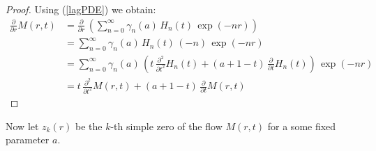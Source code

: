 \documentclass[a4paper,11pt,twoside]{amsart}
\newcommand{\verifiedeq}{=}
\newcommand{\verifiedeq}{\stackrel{\checkmark}{=}}
\begin{document}
\begin{proof}
Using (\ref{lagPDE}) we obtain:
\begin{align}
 \frac{\partial}{\partial r}M(r,t) &\verifiedeq  \frac{\partial}{\partial r}\,\left(\sum_{n=0}^\infty \gamma_n(a)\,H_n(t)\,\exp(-nr)\right) \\
 &\verifiedeq \sum_{n=0}^\infty \gamma_n(a)\,H_n(t)\,\left(-n\right)\,\exp(-nr) \\
 &\verifiedeq \sum_{n=0}^\infty \gamma_n(a)\,\left(t\,\frac{\partial^2}{\partial t^2}H_n(t)+ (a+1-t)\, \frac{\partial}{\partial t}H_n(t)  \right)\, \exp(-nr)\\
 &\verifiedeq t\,\frac{\partial^2}{\partial t^2}M(r,t) + (a+1-t)\,\frac{\partial }{\partial t}M(r,t)
\end{align}
\end{proof}

Now let $z_k(r)$ be the $k$-th simple zero of the flow $M(r,t)$ for a some fixed parameter $a$.
 
\end{document}

